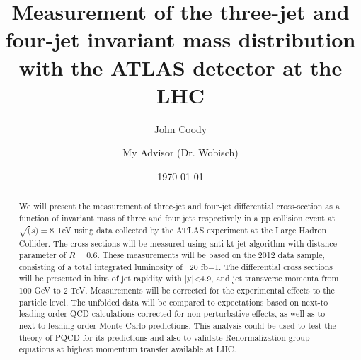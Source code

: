 \documentclass[aps,prl,preprint,groupedaddress]{revtex4}
\begin{document}

\title{Measurement of the three-jet and four-jet invariant mass distribution with the ATLAS detector at the LHC}


\author{John Coody}
\author{My Advisor (Dr. Wobisch)}


\date{\today}

\begin{abstract}
We will present the measurement of three-jet and four-jet differential cross-section as a function of invariant mass of three and four jets respectively in a pp collision event at $\sqrt(s)=8$ TeV using data collected by the ATLAS experiment at the Large Hadron Collider.  The cross sections will be measured using anti-kt jet algorithm with distance parameter of $R=0.6$. These measurements will be based on the 2012 data sample, consisting of a total integrated luminosity of ~20 fb−1. The differential cross sections will be presented in bins of jet rapidity with |y|<4.9, and jet transverse momenta from 100 GeV to 2 TeV. Measurements will be corrected for the experimental effects to the particle level.  The unfolded data will be compared to expectations based on next-to leading order QCD calculations corrected for non-perturbative effects, as well as to next-to-leading order Monte Carlo predictions. This analysis could be used to test the theory of PQCD for its predictions and also to validate Renormalization group equations at highest momentum transfer available at LHC.
\end{abstract}
\end{document}
